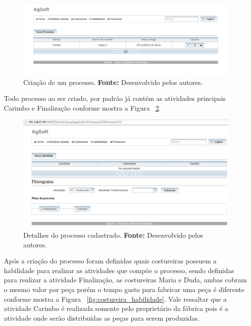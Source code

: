 \begin{figure}[h!]
	\centerline{\includegraphics[scale=0.4]{./imagens/teste_processo.png}}
	\caption[Criação de um processo.]
	{Criação de um processo. \textbf{Fonte:} Desenvolvido pelos autores.}
	\label{fig:cad_processo1}
\end{figure}

\par Todo processo ao ser criado, por padrão já contém as atividades principais
 Carimbo e Finalização conforme mostra a Figura ~\ref{fig:processo_cadastrado}.

\begin{figure}[h!]
	\centerline{\includegraphics[scale=0.3]{./imagens/tela_processo_teste1.png}}
	\caption[Detalhes do processo cadastrado.]
	{Detalhes do processo cadastrado. \textbf{Fonte:} Desenvolvido pelos autores.}
	\label{fig:processo_cadastrado}
\end{figure}

\par Após a criação do processo foram definidas quais costureiras possuem a
habilidade para realizar as atividades que compõe o processo, sendo definidas para 
realizar a atividade Finalização, as costureiras Maria e Duda, ambas cobram o 
mesmo valor por peça porém o tempo gasto para fabricar uma peça é diferente 
conforme mostra a Figura ~\ref{fig:costureira_habilidade}. Vale ressaltar que
a atividade Carimbo é realizada somente pelo proprietário da fábrica pois é a
atividade onde serão distribuídas as peças para serem produzidas. 

